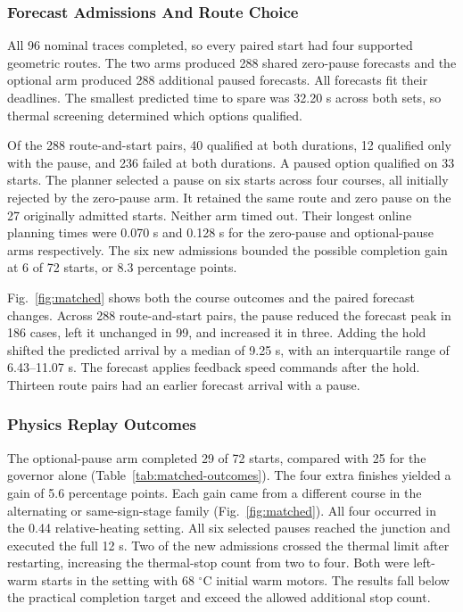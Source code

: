 \documentclass{ieeeaccess}
\begin{document}
\subsubsection{Forecast Admissions And Route Choice}

All 96 nominal traces completed, so every paired start had four supported geometric routes. The two arms produced 288 shared zero-pause forecasts and the optional arm produced 288 additional paused forecasts. All forecasts fit their deadlines. The smallest predicted time to spare was 32.20 s across both sets, so thermal screening determined which options qualified.

Of the 288 route-and-start pairs, 40 qualified at both durations, 12 qualified only with the pause, and 236 failed at both durations. A paused option qualified on 33 starts. The planner selected a pause on six starts across four courses, all initially rejected by the zero-pause arm. It retained the same route and zero pause on the 27 originally admitted starts. Neither arm timed out. Their longest online planning times were 0.070 s and 0.128 s for the zero-pause and optional-pause arms respectively. The six new admissions bounded the possible completion gain at 6 of 72 starts, or 8.3 percentage points.

Fig.~\ref{fig:matched} shows both the course outcomes and the paired forecast changes. Across 288 route-and-start pairs, the pause reduced the forecast peak in 186 cases, left it unchanged in 99, and increased it in three. Adding the hold shifted the predicted arrival by a median of 9.25 s, with an interquartile range of 6.43--11.07 s. The forecast applies feedback speed commands after the hold. Thirteen route pairs had an earlier forecast arrival with a pause.

\subsubsection{Physics Replay Outcomes}

The optional-pause arm completed 29 of 72 starts, compared with 25 for the governor alone (Table~\ref{tab:matched-outcomes}). The four extra finishes yielded a gain of 5.6 percentage points. Each gain came from a different course in the alternating or same-sign-stage family (Fig.~\ref{fig:matched}). All four occurred in the 0.44 relative-heating setting. All six selected pauses reached the junction and executed the full 12 s. Two of the new admissions crossed the thermal limit after restarting, increasing the thermal-stop count from two to four. Both were left-warm starts in the setting with 68 \ensuremath{{}^{\circ}\mathrm{C}} initial warm motors. The results fall below the practical completion target and exceed the allowed additional stop count.
\end{document}
